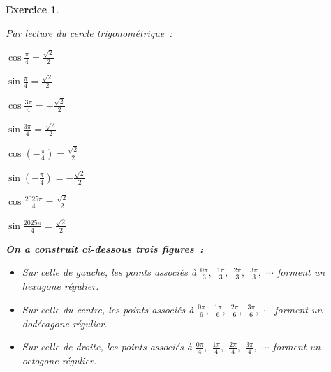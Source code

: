 \documentclass[10pt]{article}
\newtheorem{exo}{Exercice}
\begin{document}
\begin{exo}
\begin{enumerate}
Par lecture du cercle trigonométrique~:

\begin{multicols}{4}

$\cos \frac{\pi}{4}=\frac{\sqrt{2}}{2}$

$\sin \frac{\pi}{4}=\frac{\sqrt{2}}{2}$

\columnbreak

$\cos \frac{3\pi}{4}=-\frac{\sqrt{2}}{2}$

$\sin \frac{3\pi}{4}=\frac{\sqrt{2}}{2}$

\columnbreak


$\cos \left(-\frac{\pi}{4}\right)=\frac{\sqrt{2}}{2}$

$\sin \left(-\frac{\pi}{4}\right)=-\frac{\sqrt{2}}{2}$


\columnbreak

$\cos \frac{2025\pi}{4}=\frac{\sqrt{2}}{2}$

$\sin \frac{2025\pi}{4}=\frac{\sqrt{2}}{2}$

\end{multicols}


\end{enumerate}

\textbf{On a construit ci-dessous trois figures~:}

\begin{itemize}
\item[\textbullet] Sur celle de gauche, les points associés à $\frac{0\pi}{3},$ $\frac{1\pi}{3},$ $\frac{2\pi}{3},$ $\frac{3\pi}{3},$ $\cdots$ forment un hexagone régulier.
\item[\textbullet] Sur celle du centre, les points associés à $\frac{0\pi}{6},$ $\frac{1\pi}{6},$ $\frac{2\pi}{6},$ $\frac{3\pi}{6},$ $\cdots$  forment un dodécagone régulier.
\item[\textbullet] Sur celle de droite, les points associés à $\frac{0\pi}{4},$ $\frac{1\pi}{4},$ $\frac{2\pi}{4},$ $\frac{3\pi}{4},$ $\cdots$ forment un octogone régulier.
\end{itemize}


\begin{multicols}{3}



\end{multicols}
\end{exo}
\end{document}
